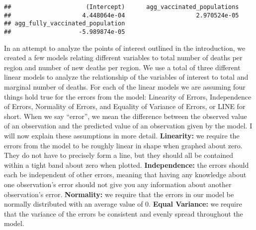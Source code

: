 \documentclass[
  12pt,
]{article}
\newenvironment{Shaded}{\begin{snugshade}}{\end{snugshade}}
\newcommand{\FloatTok}[1]{\textcolor[rgb]{0.00,0.00,0.81}{#1}}
\newcommand{\FunctionTok}[1]{\textcolor[rgb]{0.00,0.00,0.00}{#1}}
\newcommand{\NormalTok}[1]{#1}
\newcommand{\OtherTok}[1]{\textcolor[rgb]{0.56,0.35,0.01}{#1}}
\newcommand{\SpecialCharTok}[1]{\textcolor[rgb]{0.00,0.00,0.00}{#1}}
\begin{document}
\begin{Shaded}
\end{Shaded}

\begin{verbatim}
##                     (Intercept)      agg_vaccinated_populations 
##                    4.448064e-04                    2.970524e-05 
## agg_fully_vaccinated_population 
##                   -5.989874e-05
\end{verbatim}

In an attempt to analyze the points of interest outlined in the
introduction, we created a few models relating different variables to
total number of deaths per region and number of new deaths per region.
We use a total of three different linear models to analyze the
relationship of the variables of interest to total and marginal number
of deaths. For each of the linear models we are assuming four things
hold true for the errors from the model: Linearity of Errors,
Independence of Errors, Normality of Errors, and Equality of Variance of
Errors, or LINE for short. When we say ``error'', we mean the difference
between the observed value of an observation and the predicted value of
an observation given by the model. I will now explain these assumptions
in more detail. \textbf{Linearity:} we require the errors from the model
to be roughly linear in shape when graphed about zero. They do not have
to precisely form a line, but they should all be contained within a
tight band about zero when plotted. \textbf{Independence:} the errors
should each be independent of other errors, meaning that having any
knowledge about one observation's error should not give you any
information about another observation's error. \textbf{Normality:} we
require that the errors in our model be normally distributed with an
average value of 0. \textbf{Equal Variance:} we require that the
variance of the errors be consistent and evenly spread throughout the
model.
\end{document}
